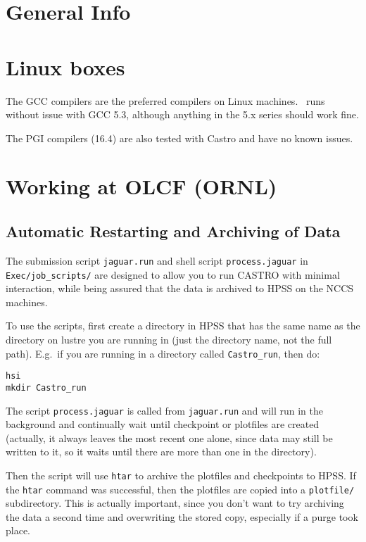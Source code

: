 \section{General Info}


\section{Linux boxes}

The GCC compilers are the preferred compilers on Linux machines.
\castro\ runs without issue with GCC 5.3, although anything in the 5.x
series should work fine.

The PGI compilers (16.4) are also tested with Castro and have no known
issues.

\section{Working at OLCF (ORNL)}


\subsection{Automatic Restarting and Archiving of Data}

The submission script {\tt jaguar.run} and shell script
{\tt process.jaguar} in {\tt Exec/job\_scripts/}
are designed to allow you to run CASTRO with minimal interaction,
while being assured that the data is archived to HPSS on the NCCS
machines.

To use the scripts, first create a directory in HPSS that has the same
name as the directory on lustre you are running in (just the directory
name, not the full path).  E.g.\ if you are running in a directory
called {\tt Castro\_run}, then do:
\begin{verbatim}
hsi
mkdir Castro_run
\end{verbatim}

The script {\tt process.jaguar} is called from {\tt jaguar.run} and
will run in the background and continually wait until checkpoint or
plotfiles are created (actually, it always leaves the most recent one
alone, since data may still be written to it, so it waits until there
are more than one in the directory).

Then the script will use {\tt htar} to archive the plotfiles and checkpoints
to HPSS.  If the {\tt htar} command was successful, then the plotfiles are
copied into a {\tt plotfile/} subdirectory.  This is actually important,
since you don't want to try archiving the data a second time and
overwriting the stored copy, especially if a purge took place.

